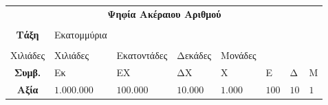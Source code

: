 \begin{longtable}{c|>{\centering\arraybackslash}m{1.5cm}|>{\centering\arraybackslash}m{1.7cm}|>{\centering\arraybackslash}m{1.4cm}|>{\centering\arraybackslash}m{1cm}|>{\centering\arraybackslash}m{1.5cm}|>{\centering\arraybackslash}m{1.2cm}|>{\centering\arraybackslash}m{1cm}}
\hline  \multicolumn{8}{c}{\textbf{Ψηφία Ακέραιου Αριθμού}} \rule[-2ex]{0pt}{5.5ex}\\ 
\hhline{========} \rule[-2ex]{0pt}{6ex} \begin{minipage}{1.5cm}
\begin{center}
{\footnotesize \textbf{Δεκαδική}}\\{\footnotesize \textbf{Τάξη}}
\end{center}
\end{minipage} &
{\footnotesize Εκατομμύρια} & 
\begin{minipage}{1.5cm}
\begin{center}
\vspace{-1.9mm}
{\footnotesize Εκατοντάδες}\\}{\footnotesize Χιλιάδες}
\end{center}
\end{minipage} & 
\begin{minipage}{1.3cm}
\begin{center}
{\footnotesize Δεκάδες}\\{\footnotesize Χιλιάδες}
\end{center}
\end{minipage} & 
{\footnotesize Χιλιάδες}& 
{\footnotesize Εκατοντάδες} & 
{\footnotesize Δεκάδες}& 
{\footnotesize Μονάδες}  \\ 
\hline \rule[-1.5ex]{0pt}{4.5ex} {\footnotesize \textbf{Συμβ.}} & {\footnotesize Εκ} & {\footnotesize ΕΧ} & {\footnotesize ΔΧ} & {\footnotesize Χ} & {\footnotesize Ε} & {\footnotesize Δ} & {\footnotesize Μ} \\ 
\hline \rule[-1.5ex]{0pt}{4.5ex} {\footnotesize \textbf{Αξία}} & {\footnotesize $ 1.000.000 $} & {\footnotesize $ 100.000 $} & {\footnotesize $ 10.000 $} & {\footnotesize $ 1.000 $} & {\footnotesize $ 100 $} & {\footnotesize $ 10 $} & {\footnotesize $ 1 $}\\
\hline 
\end{longtable}
